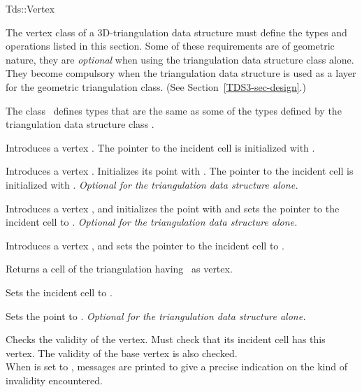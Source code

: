 	\begin{ccClass}{Tds::Vertex}
	

The vertex class of a 3D-triangulation data structure must define
the types and operations listed in this section. Some of these
requirements are of geometric nature, they are \textit{optional}
when using the triangulation data structure class alone. They become
compulsory when the triangulation data structure is used as a layer
for the geometric triangulation class. (See Section~\ref{TDS3-sec-design}.)

\ccTypes
{}
\ccThreeToTwo
{} 

The class \ccClassName\ defines types that are the same as some of the 
types defined by the triangulation data structure class .

\ccGlue
{}

\ccCreation
{}

{Introduces a vertex \ccVar. 
The pointer to the incident cell is initialized with .}

{Introduces a vertex \ccVar. Initializes its point with .
The pointer to the incident cell is initialized with
. {\textit{Optional for the triangulation data structure alone.}}}

{Introduces a vertex \ccVar, and initializes the point with 
and sets the pointer to the incident cell to . {\textit{Optional for the
triangulation data structure alone.}}}

{Introduces a vertex \ccVar, and sets the pointer to the incident cell
to .}

\ccAccessFunctions

{Returns a cell of the triangulation having \ccVar\ as vertex.}


{Sets the incident cell to .}

{Sets the point to . {\textit{Optional for the
triangulation data structure alone.}}}

\begin{ccAdvanced}

{Checks the validity of the vertex. Must check that its incident cell
has this vertex. The validity of the base vertex is also checked.\\
When  is set to , messages are printed to give
a precise indication on the kind of invalidity encountered.}
\end{ccAdvanced}

	\end{ccClass} 

